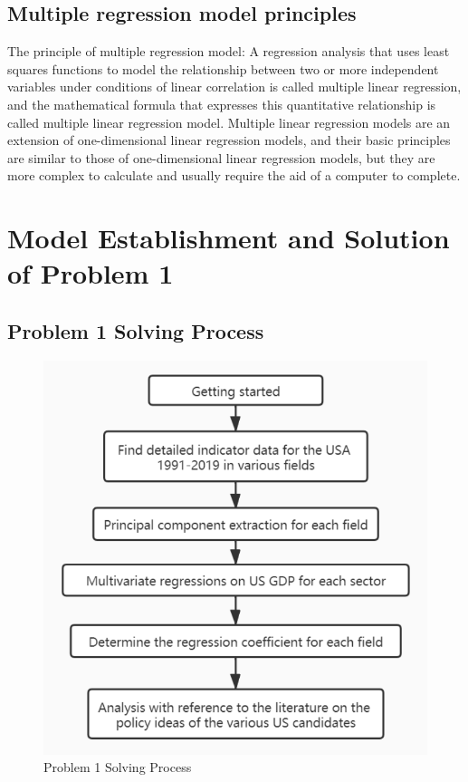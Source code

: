 \documentclass{apmcmthesis}
\begin{document}
\subsection{Multiple regression model principles}
The principle of multiple regression model: A regression analysis that uses least squares functions to model the relationship between two or more independent variables under conditions of linear correlation is called multiple linear regression, and the mathematical formula that expresses this quantitative relationship is called multiple linear regression model. Multiple linear regression models are an extension of one-dimensional linear regression models, and their basic principles are similar to those of one-dimensional linear regression models, but they are more complex to calculate and usually require the aid of a computer to complete.
\section{Model Establishment and Solution of Problem 1}

\subsection{Problem 1 Solving Process}%
\begin{figure}[H]
	\centering
	\includegraphics[width=0.7\linewidth]{screenshot001}
	\caption{Problem 1 Solving Process}
	\label{fig:screenshot001}
\end{figure}
\end{document}
